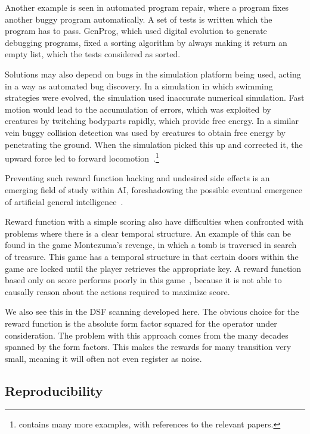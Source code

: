 \documentclass[11pt, a4paper]{report} %
\begin{document}
Another example is seen in automated program repair, where a program fixes another buggy program automatically.
A set of tests is written which the program has to pass.
GenProg, which used digital evolution to generate debugging programs, fixed a sorting algorithm by always making it return an empty list, which the tests considered as sorted.

Solutions may also depend on bugs in the simulation platform being used, acting in a way as automated bug discovery.
In a simulation in which swimming strategies were evolved, the simulation used inaccurate numerical simulation.
Fast motion would lead to the accumulation of errors, which was exploited by creatures by twitching bodyparts rapidly, which provide free energy.
In a similar vein buggy collision detection was used by creatures to obtain free energy by penetrating the ground.
When the simulation picked this up and corrected it, the upward force led to forward locomotion~\cite{1803.03453}.\footnote{\cite{1803.03453} contains many more examples, with references to the relevant papers.} 

Preventing such reward function hacking and undesired side effects is an emerging field of study within AI, foreshadowing the possible eventual emergence of artificial general intelligence~\cite{amodei16_concr_probl_ai_safet}.

Reward function with a simple scoring also have difficulties when confronted with problems where there is a clear temporal structure.
An example of this can be found in the game Montezuma's revenge, in which a tomb is traversed in search of treasure.
This game has a temporal structure in that certain doors within the game are locked until the player retrieves the appropriate key.
A reward function based only on score performs poorly in this game~\cite{mnih15_human_level_contr_throug_deep_reinf_learn}, because it is not able to causally reason about the actions required to maximize score.


We also see this in the DSF scanning developed here.
The obvious choice for the reward function is the absolute form factor squared for the operator under consideration.
The problem with this approach comes from the many decades spanned by the form factors.
This makes the rewards for many transition very small, meaning it will often not even register as noise.



\subsection{Reproducibility}
\end{document}
